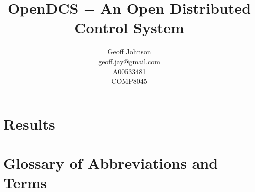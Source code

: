 \documentclass[11pt]{article}
\begin{document}
\nocite{*}

  \title{%
    OpenDCS $-$ An Open Distributed Control System\vspace{2em}
  }

  \author{%
    Geoff Johnson \vspace{0.5em} \\
    geoff.jay@gmail.com \vspace{0.5em} \\
    A00533481 \vspace{0.5em} \\
    COMP8045 \vspace{0.5em}
  }

  \maketitle
  \thispagestyle{empty}
  \newpage
  \mbox{}
  \thispagestyle{empty}

  \newpage
  \addtocounter{page}{-1}
  \tableofcontents
  \listoffigures
  \listoftables
  \lstlistoflistings

  \newpage


  

  \newpage
  

  \newpage
  

  \newpage
  

  \newpage
  

  \newpage
  

  \newpage
  

  \section{Results}\label{sec:res}


  \newpage
  \addappheadtotoc%
  \appendix
  \appendixpage%

  \section{Glossary of Abbreviations and Terms}\label{app:glossary}
\end{document}
